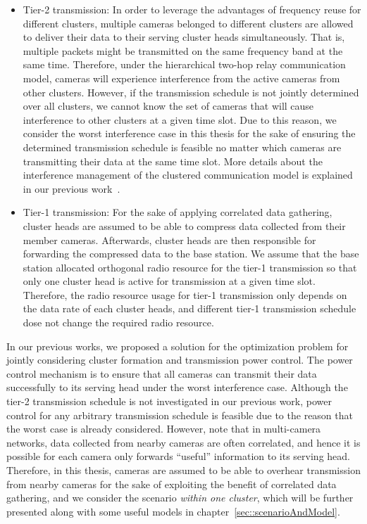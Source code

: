 \begin{itemize}
\item Tier-2 transmission: In order to leverage the advantages of frequency reuse for different clusters, multiple cameras belonged to different clusters are allowed to deliver their data to their serving cluster heads simultaneously.
That is, multiple packets might be transmitted on the same frequency band at the same time.
Therefore, under the hierarchical two-hop relay communication model, cameras will experience interference from the active cameras from other clusters.
However, if the transmission schedule is not jointly determined over all clusters, we cannot know the set of cameras that will cause interference to other clusters at a given time slot.
Due to this reason, we consider the worst interference case in this thesis for the sake of ensuring the determined transmission schedule is feasible no matter which cameras are transmitting their data at the same time slot.
More details about the interference management of the clustered communication model is explained in our previous work~\cite{steven}.
\item Tier-1 transmission: For the sake of applying correlated data gathering, cluster heads are assumed to be able to compress data collected from their member cameras.
Afterwards, cluster heads are then responsible for forwarding the compressed data to the base station.
We assume that the base station allocated orthogonal radio resource for the tier-1 transmission so that only one cluster head is active for transmission at a given time slot.
Therefore, the radio resource usage for tier-1 transmission only depends on the data rate of each cluster heads, and different tier-1 transmission schedule dose not change the required radio resource. 
\end{itemize}

In our previous works, we proposed a solution for the optimization problem for jointly considering cluster formation and transmission power control.
The power control mechanism is to ensure that all cameras can transmit their data successfully to its serving head under the worst interference case.
Although the tier-2 transmission schedule is not investigated in our previous work, power control for any arbitrary transmission schedule is feasible due to the reason that the worst case is already considered.
However, note that in multi-camera networks, data collected from nearby cameras are often correlated, and hence it is possible for each camera only forwards ``useful'' information to its serving head.
Therefore, in this thesis, cameras are assumed to be able to overhear transmission from nearby cameras for the sake of exploiting the benefit of correlated data gathering, and we consider the scenario \emph{within one cluster}, which will be further presented along with some useful models in chapter~\ref{sec::scenarioAndModel}.